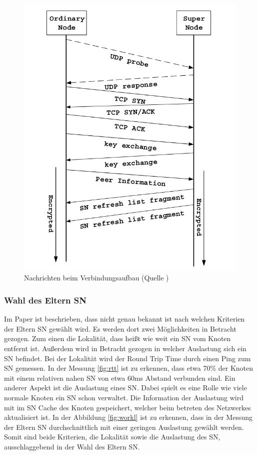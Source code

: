 \begin{figure}
\includegraphics[scale=0.3]{gfx/join}
\caption{Nachrichten beim Verbindungsaufbau (Quelle \cite{liang2006fasttrack})}
\label{fig:join}
\end{figure}

\subsubsection{Wahl des Eltern SN}
\label{subsubsec:wElternSN}

Im Paper \cite{liang2006fasttrack} ist beschrieben, dass nicht genau bekannt ist nach welchen Kriterien der Eltern SN gewählt wird. 
Es werden dort zwei Möglichkeiten in Betracht gezogen.
Zum einen die Lokalität, dass heißt wie weit ein SN vom Knoten entfernt ist.
Außerdem wird in Betracht gezogen in welcher Auslastung sich ein SN befindet.
Bei der Lokalität wird der Round Trip Time durch einen Ping zum SN gemessen.
In der Messung \ref{fig:rtt} ist zu erkennen, dass  etwa 70\% der Knoten mit einem relativen nahen SN von etwa 60ms Abstand verbunden sind.
Ein anderer Aspekt ist die Auslastung eines SN.
Dabei spielt es eine Rolle wie viele normale Knoten ein SN schon verwaltet.
Die Information der Auslastung wird mit im SN Cache des Knoten gespeichert, welcher beim betreten des Netzwerkes aktualisiert ist.
In der Abbildung \ref{fig:workl} ist zu erkennen, dass in der Messung der Eltern SN durchschnittlich mit einer geringen Auslastung gewählt werden.
Somit sind beide Kriterien, die Lokalität sowie die Auslastung des SN, ausschlaggebend in der Wahl des Eltern SN.

